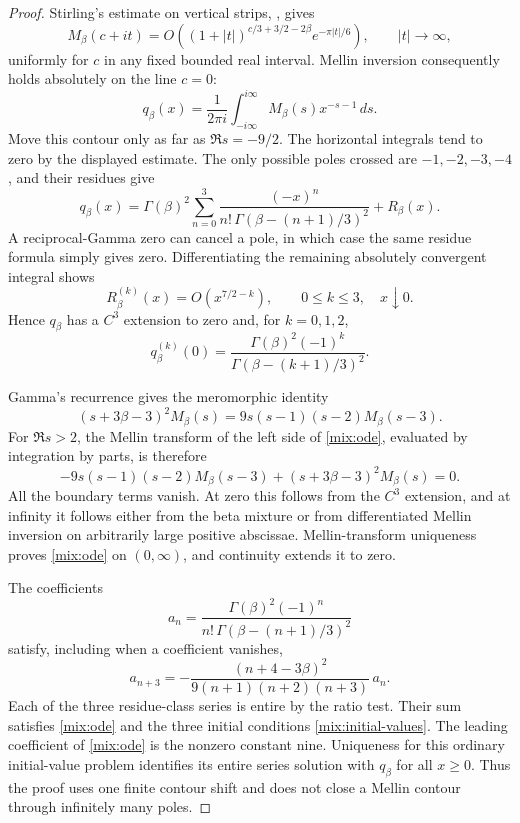 \documentclass[11pt,a4paper]{article}
\numberwithin{equation}{section}
\theoremstyle{definition}\newtheorem{definition}[theorem]{Definition}
\theoremstyle{remark}\newtheorem{remark}[theorem]{Remark}
\begin{document}
\begin{proof}
Stirling's estimate on vertical strips, \cite[\S5.11]{DLMF}, gives
\[
 M_\beta(c+it)
 =O\!\left((1+|t|)^{c/3+3/2-2\beta}e^{-\pi|t|/6}\right),
 \qquad |t|\longrightarrow\infty,
\]
uniformly for \(c\) in any fixed bounded real interval.  Mellin
inversion consequently holds absolutely on the line \(c=0\):
\[
 q_\beta(x)=\frac1{2\pi i}\int_{-i\infty}^{i\infty}
                  M_\beta(s)x^{-s-1}\,ds.
\]
Move this contour only as far as \(\Re s=-9/2\).  The horizontal
integrals tend to zero by the displayed estimate.  The only possible
poles crossed are \(-1,-2,-3,-4\), and their residues give
\[
 q_\beta(x)=\Gamma(\beta)^2
    \sum_{n=0}^{3}\frac{(-x)^n}{n!\,\Gamma(\beta-(n+1)/3)^2}
       +R_\beta(x).
\]
A reciprocal-Gamma zero can cancel a pole, in which case the same
residue formula simply gives zero.  Differentiating the remaining
absolutely convergent integral shows
\[
 R_\beta^{(k)}(x)=O(x^{7/2-k}),
           \qquad 0\le k\le3,\quad x\downarrow0.
\]
Hence \(q_\beta\) has a \(C^3\) extension to zero and, for
\(k=0,1,2\),
\begin{equation}\label{mix:initial-values}
 q_\beta^{(k)}(0)=
       \frac{\Gamma(\beta)^2(-1)^k}
                    {\Gamma(\beta-(k+1)/3)^2}.
\end{equation}

Gamma's recurrence gives the meromorphic identity
\[
 (s+3\beta-3)^2M_\beta(s)
       =9s(s-1)(s-2)M_\beta(s-3).
\]
For \(\Re s>2\), the Mellin transform of the left side of
\eqref{mix:ode}, evaluated by integration by parts, is therefore
\[
 -9s(s-1)(s-2)M_\beta(s-3)
            +(s+3\beta-3)^2M_\beta(s)=0.
\]
All the boundary terms vanish.  At zero this follows from the
\(C^3\) extension, and at infinity it follows either from the beta
mixture or from differentiated Mellin inversion on arbitrarily large
positive abscissae.  Mellin-transform uniqueness proves
\eqref{mix:ode} on \((0,\infty)\), and continuity extends it to zero.

The coefficients
\[
 a_n=\frac{\Gamma(\beta)^2(-1)^n}
                  {n!\,\Gamma(\beta-(n+1)/3)^2}
\]
satisfy, including when a coefficient vanishes,
\begin{equation}\label{mix:coefficient-recurrence}
 a_{n+3}=-\frac{(n+4-3\beta)^2}
                    {9(n+1)(n+2)(n+3)}\,a_n.
\end{equation}
Each of the three residue-class series is entire by the ratio test.
Their sum satisfies \eqref{mix:ode} and the three initial conditions
\eqref{mix:initial-values}.  The leading coefficient of
\eqref{mix:ode} is the nonzero constant nine.  Uniqueness for this
ordinary initial-value problem identifies its entire series solution
with \(q_\beta\) for all \(x\ge0\).  Thus the proof uses one finite
contour shift and does not close a Mellin contour through infinitely
many poles.
\end{proof}
\end{document}
